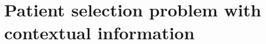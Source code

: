 \documentclass[12pt,a4paper]{article}
\begin{document}
	\color{black}

	



	
	
	
	
	
	\section{Patient selection problem with contextual information \label{sec:knapsack}}
\end{document}
